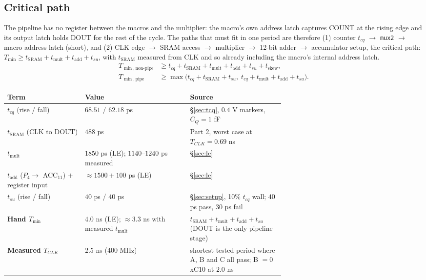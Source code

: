 \documentclass[10pt,letterpaper]{article}
\newcommand{\code}[1]{\texttt{#1}}
\newcommand{\sref}[1]{\S\ref{#1}}
\begin{document}
\subsection{Critical path}
The pipeline has no register between the macros and the multiplier: the macro's own address latch captures COUNT at the rising edge and its output latch holds DOUT for the rest of the cycle. The paths that must fit in one period are therefore (1) counter $t_{cq}$ $\to$ \code{mux2} $\to$ macro address latch (short), and (2) CLK edge $\to$ SRAM access $\to$ multiplier $\to$ 12-bit adder $\to$ accumulator setup, the critical path: $T_{\min}\ge t_{\text{SRAM}}+t_{\text{mult}}+t_{\text{add}}+t_{su}$, with $t_{\text{SRAM}}$ measured from CLK and so already including the macro's internal address latch.
\begin{align*}
T_{\min,\text{non-pipe}}
  &\ge t_{cq}+t_{\text{SRAM}}+t_{\text{mult}}+t_{\text{add}}+t_{su}+t_{\text{skew}},\\
T_{\min,\text{pipe}}
  &\ge \max\bigl(t_{cq}+t_{\text{SRAM}}+t_{su},\;
                 t_{cq}+t_{\text{mult}}+t_{\text{add}}+t_{su}\bigr).
\end{align*}
\begin{center}\small\begin{tabularx}{\linewidth}{@{}P{0.28\linewidth}P{0.38\linewidth}L@{}}\toprule
Term & Value & Source\\\midrule
$t_{cq}$ (rise / fall) & $68.51$ / $62.18$ ps & \sref{sec:tcq}, $0.4$ V markers, $C_Q=1$ fF\\\addlinespace
$t_{\text{SRAM}}$ (CLK to DOUT) & $488$ ps & Part 2, worst case at $T_{CLK}=0.69$ ns\\\addlinespace
$t_{\text{mult}}$ & $1850$ ps (LE); $1140$--$1240$ ps measured & \sref{sec:le}\\\addlinespace
$t_{\text{add}}$ ($P_4\to$ ACC$_{11}$) $+$ register input & $\approx1500+100$ ps (LE) & \sref{sec:le}\\\addlinespace
$t_{su}$ (rise / fall) & $40$ ps / $40$ ps & \sref{sec:setup}, 10\% $t_{cq}$ wall; $40$ ps pass, $30$ ps fail\\\midrule
\textbf{Hand $T_{\min}$} & $\mathbf{4.0}$ ns (LE); $\approx3.3$ ns with measured $t_{\text{mult}}$ & $t_{\text{SRAM}}+t_{\text{mult}}+t_{\text{add}}+t_{su}$ (DOUT is the only pipeline stage)\\\addlinespace
\textbf{Measured $T_{CLK}$} & $\mathbf{2.5}$ ns ($400$ MHz) & shortest tested period where A, B and C all pass; B $=0$xC10 at $2.0$ ns\\\bottomrule
\end{tabularx}\end{center}
\end{document}
